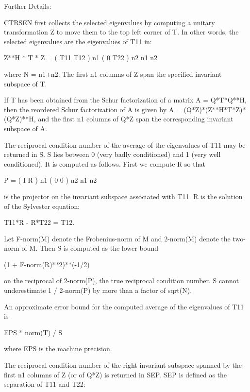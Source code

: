 \begin{DoxyParagraph}{Further Details\+: }
\begin{DoxyVerb}  CTRSEN first collects the selected eigenvalues by computing a unitary
  transformation Z to move them to the top left corner of T. In other
  words, the selected eigenvalues are the eigenvalues of T11 in:

          Z**H * T * Z = ( T11 T12 ) n1
                         (  0  T22 ) n2
                            n1  n2

  where N = n1+n2. The first
  n1 columns of Z span the specified invariant subspace of T.

  If T has been obtained from the Schur factorization of a matrix
  A = Q*T*Q**H, then the reordered Schur factorization of A is given by
  A = (Q*Z)*(Z**H*T*Z)*(Q*Z)**H, and the first n1 columns of Q*Z span the
  corresponding invariant subspace of A.

  The reciprocal condition number of the average of the eigenvalues of
  T11 may be returned in S. S lies between 0 (very badly conditioned)
  and 1 (very well conditioned). It is computed as follows. First we
  compute R so that

                         P = ( I  R ) n1
                             ( 0  0 ) n2
                               n1 n2

  is the projector on the invariant subspace associated with T11.
  R is the solution of the Sylvester equation:

                        T11*R - R*T22 = T12.

  Let F-norm(M) denote the Frobenius-norm of M and 2-norm(M) denote
  the two-norm of M. Then S is computed as the lower bound

                      (1 + F-norm(R)**2)**(-1/2)

  on the reciprocal of 2-norm(P), the true reciprocal condition number.
  S cannot underestimate 1 / 2-norm(P) by more than a factor of
  sqrt(N).

  An approximate error bound for the computed average of the
  eigenvalues of T11 is

                         EPS * norm(T) / S

  where EPS is the machine precision.

  The reciprocal condition number of the right invariant subspace
  spanned by the first n1 columns of Z (or of Q*Z) is returned in SEP.
  SEP is defined as the separation of T11 and T22:


\end{DoxyVerb}
\end{DoxyParagraph}
